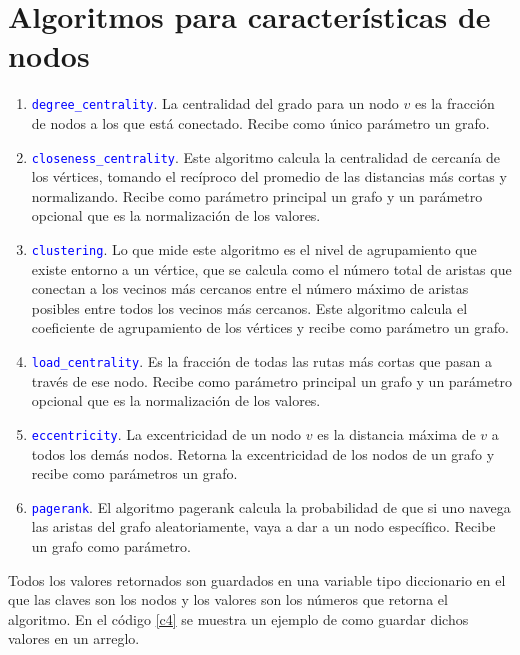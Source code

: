 \documentclass[12pt]{article}
\begin{document}
\newpage
\section{Algoritmos para características de nodos}

\begin{enumerate}
\item \textcolor{blue}{\texttt{degree\_centrality}}. La centralidad del grado para un nodo $v$ es la fracción de nodos a los que está conectado. Recibe como único parámetro un grafo.  

\item \textcolor{blue}{\texttt{closeness\_centrality}}. Este algoritmo calcula la centralidad de cercanía de los vértices, tomando el recíproco del promedio de las distancias más cortas y normalizando. Recibe como parámetro principal un grafo y un parámetro opcional que es la normalización de los valores.
 
\item \textcolor{blue}{\texttt{clustering}}. Lo que mide este algoritmo es el nivel de agrupamiento que existe entorno a un vértice, que se calcula como el número total de aristas que conectan a los vecinos más cercanos entre el número máximo de aristas posibles entre todos los vecinos más cercanos. Este algoritmo calcula el coeficiente de agrupamiento de los vértices y recibe como parámetro un grafo.

\item \textcolor{blue}{\texttt{load\_centrality}}. Es la fracción de todas las rutas más cortas que pasan a través de ese nodo. Recibe como parámetro principal un grafo y un parámetro opcional que es la normalización de los valores.

\item \textcolor{blue}{\texttt{eccentricity}}. La excentricidad de un nodo $v$ es la distancia máxima de $v$ a todos los demás nodos. Retorna la excentricidad de los nodos de un grafo y recibe como parámetros un grafo.

\item \textcolor{blue}{\texttt{pagerank}}. El algoritmo pagerank calcula la probabilidad de que si uno navega las aristas del grafo aleatoriamente, vaya a dar a un nodo específico. Recibe un grafo como parámetro.

\end{enumerate}

{\scriptsize *Todos los valores retornados son guardados en una variable tipo diccionario en el que las claves son los nodos y los valores son los números que retorna el algoritmo. En el código \ref{c4} se muestra un ejemplo de como guardar dichos valores en un arreglo.}  
\end{document}
